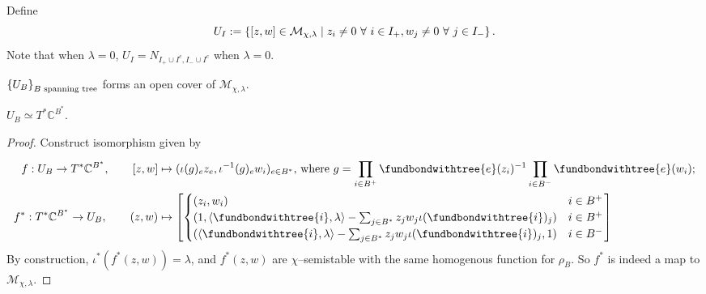 \documentclass[b5paper]{article}
\newcommand{\MM}{\mathcal{M}}
\begin{document}
Define 
\[
U_I:=\CB{[z,w]\in \MM_{\chi,\lambda}\mid z_i\neq 0\ \forall\ i\in I_+, w_j\neq 0\ \forall\ j\in I_-}.
\]
Note that when $\lambda=0$, $U_I=N_{I_+\cup I^c,I_-\cup I^c}$ when $\lambda=0$.

\begin{proposition}[pps:]{}
  $\left\{U_B\right\}_{B \textnormal{ spanning tree}}$ forms an open cover of $\MM_{\chi,\lambda}$.
\end{proposition}

\begin{proposition}[pps:]{}
  $U_B\simeq T^*\mathbb{C}^{B^*}$.
  \begin{proof}
      Construct isomorphism given by
      \begin{alignat*}{1}
          f:U_B\rightarrow T^*\mathbb{C}^{B^*}, \qquad [z,w]&\mapsto (\iota(g)_ez_e,\iota^{-1}(g)_ew_i)_{e\in B^*}\textnormal{, where }g=\prod_{i\in B^+}^{}\fundbondwithtree{e}(z_i)^{-1}\prod_{i\in B^-}^{}\fundbondwithtree{e}(w_i);\\
          f^*:T^*\mathbb{C}^{B^*}\rightarrow U_B, \qquad (z,w)&\mapsto 
          \left[
              \begin{cases}
                  (z_i,w_i)&i\in B^+\\
                  (1, \AB{\fundbondwithtree{i},\lambda}-\sum_{j\in B^*}^{}z_jw_j\iota(\fundbondwithtree{i})_j) &i\in B^+\\
                  (\AB{\fundbondwithtree{i},\lambda}-\sum_{j\in B^*}^{}z_jw_j\iota(\fundbondwithtree{i})_j,1) &i\in B^-\\
              \end{cases}
          \right]
      \end{alignat*}
      By construction, $\iota^*(f^*(z,w))=\lambda$, and $f^*(z,w)$ are $\chi$--semistable with the same homogenous function for $\rho_{B}$. So $f^*$ is indeed a map to $\MM_{\chi,\lambda}$.
  \end{proof}
\end{proposition}
\end{document}
